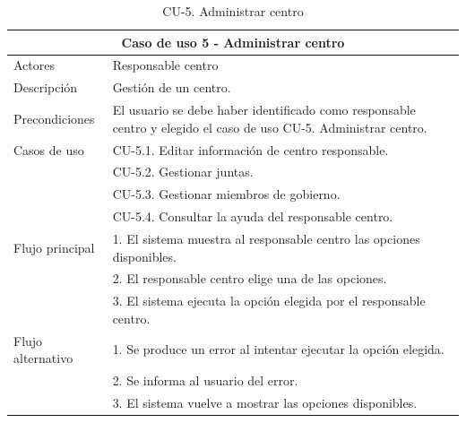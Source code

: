 \begin{table}[H]
        \caption{CU-5. Administrar centro}
        \label{tab:CU-5}
        \begin{center}
            \begin{tabular}{|l|p{12cm}|}
                \hline
                \multicolumn{2}{|c|}{Caso de uso 5 - Administrar centro} \\ \hline \hline
                Actores                 &   Responsable centro         \\  \hline
                Descripción             &   Gestión de un centro. \\  \hline
                Precondiciones          &   El usuario se debe haber identificado como responsable centro y elegido el caso de uso CU-5. Administrar centro.  \\  \hline
                Casos de uso            &  CU-5.1. Editar información de centro responsable. \\ 
                &
                CU-5.2. Gestionar juntas. \\ 
                &
                CU-5.3. Gestionar miembros de gobierno. \\ 
                &
                CU-5.4. Consultar la ayuda del responsable centro. \\ 
                \hline
                Flujo principal     &    1. El sistema muestra al responsable centro las opciones disponibles.\\ 
                &   2. El responsable centro elige una de las opciones.\\ 
                &   3. El sistema ejecuta la opción elegida por el responsable centro.\\ 
                \hline
                Flujo alternativo    &  1. Se produce un error al intentar ejecutar la opción elegida. \\ 
                &  2. Se informa al usuario del error.  \\  
                &  3. El sistema vuelve a mostrar las opciones disponibles.  \\
                \hline
            \end{tabular}
        \end{center}
    \end{table}

